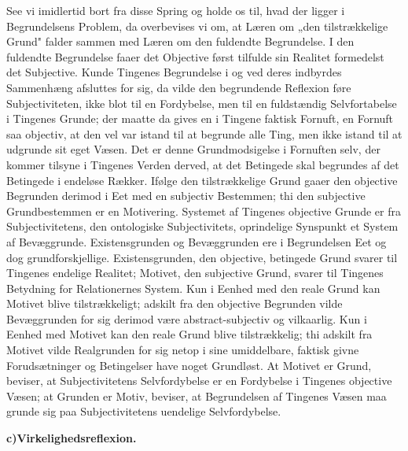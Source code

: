 \documentclass[12pt]{book}
\newcommand{\opage}[1]{\marginnote{\footnotesize\textit{[#1]}}}
\begin{document}
See vi imidlertid bort fra disse Spring og holde os til, hvad der ligger i
Begrundelsens Problem, da overbevises vi om, at Læren om „den tilstrækkelige Grund"
falder sammen med Læren om den fuldendte Begrundelse. I den fuldendte Begrundelse
faaer det Objective først tilfulde sin Realitet formedelst det Subjective. Kunde
Tingenes Begrundelse i og ved deres indbyrdes Sammenhæng afsluttes for sig, da vilde
den begrundende Reflexion føre Subjectiviteten, ikke blot til en Fordybelse, men til
en fuldstændig Selvfortabelse i Tingenes Grunde; der maatte da gives en i Tingene
faktisk Fornuft, en Fornuft saa objectiv, at den vel var istand til at begrunde alle
Ting, men ikke istand til at udgrunde sit eget Væsen. Det er denne Grundmodsigelse i
Fornuften selv, der kommer tilsyne i Tingenes Verden derved, at det Betingede skal
begrundes af det Betingede i endeløse Rækker. Ifølge den tilstrækkelige Grund gaaer
den objective Begrunden derimod i Eet med en subjectiv Bestemmen; thi den subjective
Grundbestemmen er en Motivering. Systemet af Tingenes objective Grunde er fra
Subjectivitetens, den ontologiske Subjectivitets, oprindelige Synspunkt et System af
Bevæggrunde. Existensgrunden og Bevæggrunden ere i Begrundelsen Eet og dog
grundforskjellige. Existensgrunden, den objective, betingede Grund svarer til Tingenes
endelige Realitet; Motivet, den subjective Grund, svarer til Tingenes Betydning for
Relationernes System. Kun i Eenhed med den reale Grund kan Motivet blive
tilstrækkeligt; adskilt fra den objective Begrunden vilde Bevæggrunden for sig derimod
være abstract-subjectiv og vilkaarlig. Kun i Eenhed med Motivet kan den reale Grund
blive tilstrækkelig; thi adskilt fra Motivet vilde Realgrunden for sig netop i sine
umiddelbare, faktisk givne Forudsætninger og Betingelser have noget Grundløst. At
Motivet er Grund, beviser, at Subjectivitetens Selvfordybelse
\opage{105} er en Fordybelse i Tingenes objective Væsen; at Grunden er Motiv, beviser, at
Begrundelsen af Tingenes Væsen maa grunde sig paa Subjectivitetens uendelige
Selvfordybelse.

\begin{center}{\bfseries c)\quad Virkelighedsreflexion.}\end{center}
\end{document}
